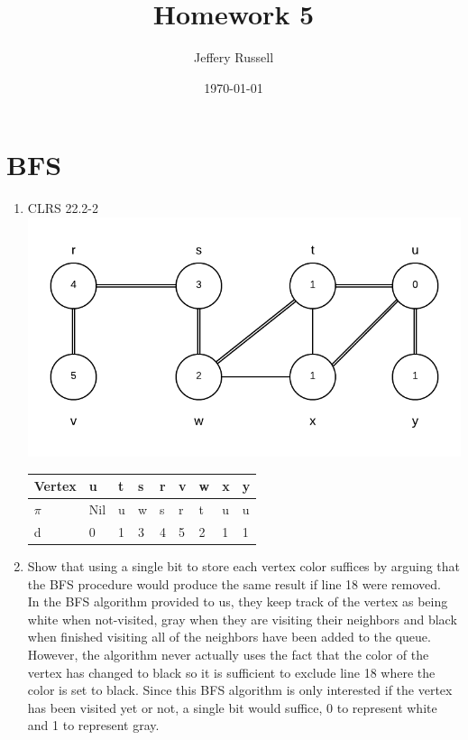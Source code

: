 \documentclass[12pt]{article}%
\begin{document}
\title{Homework 5}
\author{Jeffery Russell}
\date{\today}
\maketitle

\section{BFS}

\begin{enumerate}[label=(\alph*)]
    \item CLRS 22.2-2\\
    \includegraphics[width=\textwidth]{bfs}

\begin{table}[h]
\begin{tabular}{l|l|l|l|l|l|l|l|l}
Vertex              & u   & t & s & r & v & w & x & y \\ \hline
$\pi$ & Nil & u & w & s & r & t & u & u \\ \hline
d                   & 0   & 1 & 3 & 4 & 5 & 2 & 1 & 1
\end{tabular}
\end{table}
    
    \item Show that using a single bit to store each vertex color suffices by arguing that the BFS procedure would produce the same result if line 18 were removed.\\
    
    In the BFS algorithm provided to us, they keep track of the vertex as being white when not-visited,
    gray when they are visiting their neighbors and black when finished visiting all of the neighbors have been added to the queue. However, the algorithm never actually uses the fact that the color of the vertex has changed to black so it is sufficient to exclude line 18 where the color is set to black. Since this BFS algorithm is only interested if the vertex has been visited yet or not, a single bit would suffice, 0 to represent white and 1 to represent gray. 
    

\end{enumerate}
\end{document}
